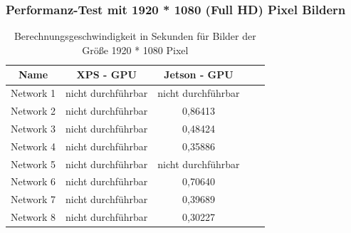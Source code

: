  \begin{frame}
     \frametitle{Performanz-Test mit 1920 * 1080 (Full HD) Pixel Bildern}
 
    \begin{table}[H]
        \centering
        \begin{tabular}{ |c|c|c|c|c| }
            \hline
            \textbf{Name} & \textbf{XPS - GPU} & \textbf{Jetson - GPU}   \\ \hline
            Network  1 & \textcolor{danger}{nicht durchführbar} & \textcolor{danger}{nicht durchführbar} \\ \hline
            Network  2 & \textcolor{danger}{nicht durchführbar} & 0,86413                                \\ \hline
            Network  3 & \textcolor{danger}{nicht durchführbar} & 0,48424                                \\ \hline
            Network  4 & \textcolor{danger}{nicht durchführbar} & 0,35886                                \\ \hline
            Network  5 & \textcolor{danger}{nicht durchführbar} & \textcolor{danger}{nicht durchführbar} \\ \hline
            Network  6 & \textcolor{danger}{nicht durchführbar} & 0,70640                                \\ \hline
            Network  7 & \textcolor{danger}{nicht durchführbar} & 0,39689                                \\ \hline
            Network  8 & \textcolor{danger}{nicht durchführbar} & 0,30227                                \\ \hline
        \end{tabular}
        \caption{Berechnungsgeschwindigkeit in Sekunden für Bilder der Größe 1920 * 1080 Pixel}
        \label{tab:1920x1080}
    \end{table}
    
 \end{frame}

